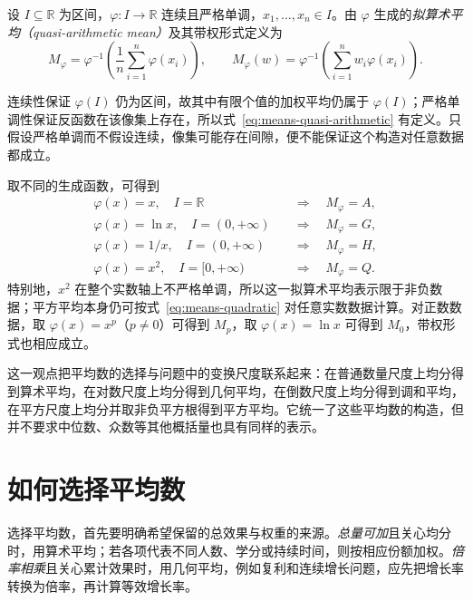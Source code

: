 \documentclass[UTF8,12pt,a4paper,fontset=fandol]{ctexart}
\begin{document}
\begin{definition}
设 $I\subseteq\mathbb R$ 为区间，$\varphi:I\to\mathbb R$ 连续且严格单调，$x_1,\ldots,x_n\in I$。由 $\varphi$ 生成的\emph{拟算术平均（quasi-arithmetic mean）}及其带权形式定义为
\begin{equation}
\label{eq:means-quasi-arithmetic}
  M_{\varphi}=\varphi^{-1}\left(\frac{1}{n}\sum_{i=1}^n\varphi(x_i)\right),
  \qquad
  M_{\varphi}(w)=\varphi^{-1}\left(\sum_{i=1}^n w_i\varphi(x_i)\right).
\end{equation}
\end{definition}

连续性保证 $\varphi(I)$ 仍为区间，故其中有限个值的加权平均仍属于 $\varphi(I)$；严格单调性保证反函数在该像集上存在，所以式~\eqref{eq:means-quasi-arithmetic} 有定义。只假设严格单调而不假设连续，像集可能存在间隙，便不能保证这个构造对任意数据都成立。

取不同的生成函数，可得到
\[
\begin{aligned}
  \varphi(x)=x,\quad I=\mathbb R
  &\quad\Longrightarrow\quad M_{\varphi}=A,\\
  \varphi(x)=\ln x,\quad I=(0,+\infty)
  &\quad\Longrightarrow\quad M_{\varphi}=G,\\
  \varphi(x)=1/x,\quad I=(0,+\infty)
  &\quad\Longrightarrow\quad M_{\varphi}=H,\\
  \varphi(x)=x^2,\quad I=[0,+\infty)
  &\quad\Longrightarrow\quad M_{\varphi}=Q.
\end{aligned}
\]
特别地，$x^2$ 在整个实数轴上不严格单调，所以这一拟算术平均表示限于非负数据；平方平均本身仍可按式~\eqref{eq:means-quadratic} 对任意实数数据计算。对正数数据，取 $\varphi(x)=x^p$（$p\ne0$）可得到 $M_p$，取 $\varphi(x)=\ln x$ 可得到 $M_0$，带权形式也相应成立。

这一观点把平均数的选择与问题中的变换尺度联系起来：在普通数量尺度上均分得到算术平均，在对数尺度上均分得到几何平均，在倒数尺度上均分得到调和平均，在平方尺度上均分并取非负平方根得到平方平均。它统一了这些平均数的构造，但并不要求中位数、众数等其他概括量也具有同样的表示。

\section{如何选择平均数}
\label{sec:means-selection}

选择平均数，首先要明确希望保留的总效果与权重的来源。\emph{总量可加}且关心均分时，用算术平均；若各项代表不同人数、学分或持续时间，则按相应份额加权。\emph{倍率相乘}且关心累计效果时，用几何平均，例如复利和连续增长问题，应先把增长率转换为倍率，再计算等效增长率。
\end{document}
